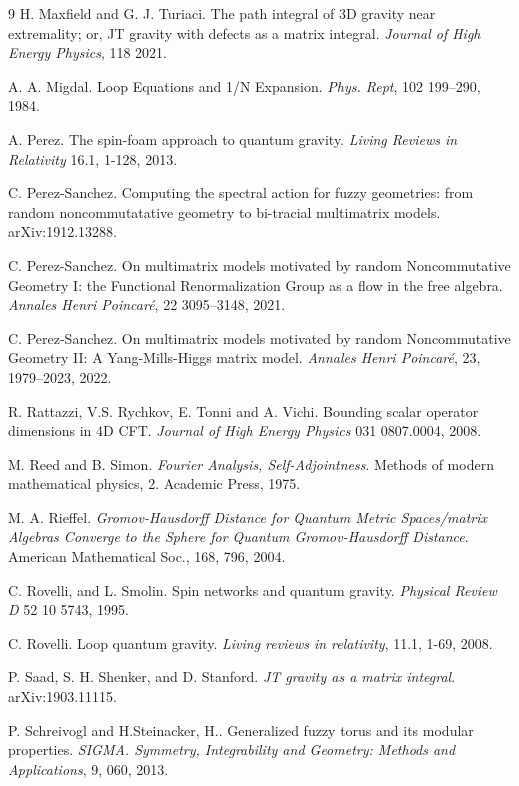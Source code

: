 \documentclass[10pt]{article}
\begin{document}
\begin{thebibliography}{9}
H. Maxfield and G. J. Turiaci. The path integral of 3D gravity near extremality; or, JT gravity with defects as a matrix integral. \textit{Journal of High Energy Physics},  118 2021. 


A. A. Migdal. Loop Equations and 1/N Expansion.
\textit{Phys. Rept}, 102 199–290, 1984.


A. Perez. The spin-foam approach to quantum gravity. \textit{Living Reviews in Relativity} 16.1, 1-128, 2013.

C. Perez-Sanchez. Computing the spectral action for fuzzy geometries: from random noncommutatative geometry to bi-tracial multimatrix models.  	arXiv:1912.13288.

C. Perez-Sanchez. On multimatrix models motivated by random Noncommutative Geometry I: the Functional Renormalization Group as a flow in the free algebra. \textit{Annales Henri Poincar\'e}, 22 3095–3148, 2021.

C. Perez-Sanchez. On multimatrix models motivated by random Noncommutative Geometry II: A Yang-Mills-Higgs matrix model.\textit{ Annales Henri Poincaré}, 23, 1979–2023, 2022.

 R. Rattazzi, V.S. Rychkov, E. Tonni and A. Vichi. Bounding scalar operator dimensions in
4D CFT. \textit{Journal of High Energy Physics}  031 0807.0004, 2008.

M. Reed and B. Simon. \textit{Fourier Analysis, Self-Adjointness}. Methods of modern mathematical
physics, 2. Academic Press, 1975.

M. A. Rieffel. \textit{Gromov-Hausdorff Distance for Quantum Metric Spaces/matrix Algebras Converge to the Sphere for Quantum Gromov-Hausdorff Distance}. American Mathematical Soc., 168, 796, 2004.

C. Rovelli, and L. Smolin. Spin networks and quantum gravity. \textit{Physical Review D} 52 10 5743, 1995.

C. Rovelli. Loop quantum gravity. \textit{Living reviews in relativity}, 11.1, 1-69, 2008.

P. Saad, S. H. Shenker, and D. Stanford. \textit{JT gravity as a matrix integral}. 	arXiv:1903.11115.

P. Schreivogl and H.Steinacker, H.. Generalized fuzzy torus and its modular properties. \textit{SIGMA. Symmetry, Integrability and Geometry: Methods and Applications}, 9, 060, 2013.


\end{thebibliography}
\end{document}
